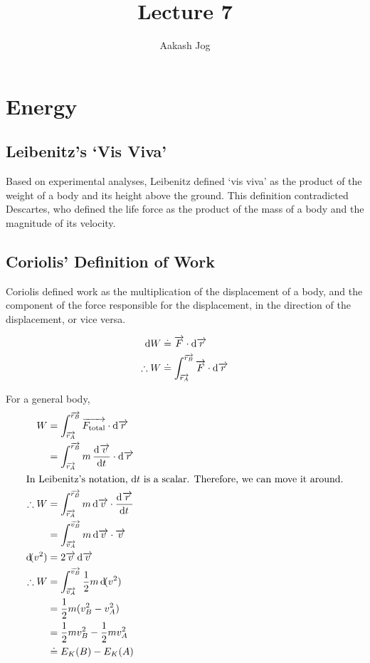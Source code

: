 \documentclass[fleqn]{article}
\title{Lecture 7}
\author{Aakash Jog}
\date{\formatdate{18}{11}{2014}}
\theoremstyle{definition}
\theoremstyle{theorem}
\begin{document}
\maketitle

\tableofcontents

\newpage
\section{Energy}

\subsection{Leibenitz's `Vis Viva'}

Based on experimental analyses, Leibenitz defined `vis viva' as the product of the weight of a body and its height above the ground. This definition contradicted Descartes, who defined the life force as the product of the mass of a body and the magnitude of its velocity. 

\subsection{Coriolis' Definition of Work}

Coriolis defined work as the multiplication of the displacement of a body, and the component of the force responsible for the displacement, in the direction of the displacement, or vice versa.

\begin{align*}
	\dif W &\doteq \overrightarrow{F} \cdot \dif \overrightarrow{r} \\
	\therefore W &\doteq \int_{\overrightarrow{r_A}}^{\overrightarrow{r_B}} \overrightarrow{F} \cdot \dif \overrightarrow{r}
\end{align*}

For a general body,
\begin{align*}
	W &=\int_{\overrightarrow{r_A}}^{\overrightarrow{r_B}} \overrightarrow{F_{\text{total}}} \cdot \dif \overrightarrow{r} \\
	&= \int_{\overrightarrow{r_A}}^{\overrightarrow{r_B}} m \dod{\overrightarrow{v}}{t} \cdot \dif \overrightarrow{r} \\
	\intertext{In Leibenitz's notation, $\dif t$ is a scalar. Therefore, we can move it around.}
	\therefore W &= \int_{\overrightarrow{r_A}}^{\overrightarrow{r_B}} m \dif \overrightarrow{v} \cdot \dod{\overrightarrow{r}}{t} \\
	&= \int_{\overrightarrow{v_A}}^{\overrightarrow{v_B}} m \dif \overrightarrow{v} \cdot \overrightarrow{v} \\
	\dif (v^2) &= 2 \overrightarrow{v} \dif \overrightarrow{v} \\
	\therefore W &= \int_{\overrightarrow{v_A}}^{\overrightarrow{v_B}} \dfrac{1}{2} m \dif (v^2) \\
	&= \dfrac{1}{2} m (v_B^2 - v_A^2) \\
	&= \dfrac{1}{2} m v_B^2 - \dfrac{1}{2} m v_A^2 \\
	&\doteq E_K(B) - E_K(A)
\end{align*}
\end{document}
